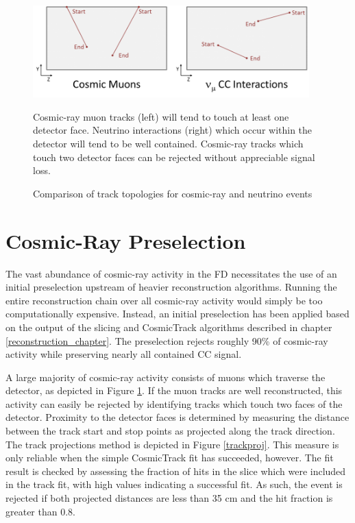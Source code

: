 \begin{figure}
\begin{center}
\includegraphics[width=0.95\textwidth]{figures/selection/cosmicmuons.png}
\end{center}
\caption{Comparison of track topologies for cosmic-ray and neutrino events}{
Cosmic-ray muon tracks (left) will tend to touch at least one detector face.
Neutrino interactions (right) which occur within the detector will tend to
be well contained.
Cosmic-ray tracks which touch two detector faces can be rejected without
appreciable signal loss.
}

\label{cosmictracks}
\end{figure}



\section{Cosmic-Ray Preselection}
\label{cosmicveto_section}

The vast abundance of cosmic-ray activity in the FD necessitates the
use of an initial preselection upstream of heavier reconstruction
algorithms.
Running the entire reconstruction chain over all cosmic-ray activity would
simply be too computationally expensive.
Instead, an initial preselection has been applied based on the output
of the slicing and CosmicTrack algorithms described in chapter
\ref{reconstruction_chapter}.
The preselection rejects roughly 90\% of cosmic-ray activity while preserving
nearly all contained \numu CC signal.

A large majority of cosmic-ray activity consists of muons which traverse the
detector, as depicted in Figure \ref{cosmictracks}.
If the muon tracks are well reconstructed, this activity can easily be rejected
by identifying tracks which touch two faces of the detector.
Proximity to the detector faces is determined by measuring the distance
between the track start and stop points as projected along the track
direction.
The track projections method is depicted in Figure \ref{trackproj}.
This measure is only reliable when the simple CosmicTrack fit has succeeded,
however.
The fit result is checked by assessing the fraction of hits in the slice
which were included in the track fit, with high values indicating a
successful fit.
As such, the event is rejected if both projected distances are less
than 35 cm and
the hit fraction is greater than 0.8.


